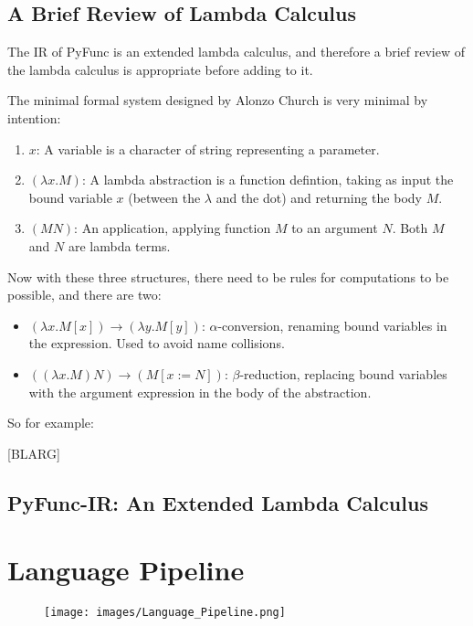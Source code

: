 \documentclass{l4proj}
\begin{document}
\subsection{A Brief Review of Lambda Calculus}

The IR of PyFunc is an extended lambda calculus, and therefore a brief review of the lambda calculus is appropriate before adding to it.

The minimal formal system designed by Alonzo Church is very minimal by intention:

\begin{enumerate}
    \item $x$: A variable is a character of string representing a parameter.
    \item $(\lambda x . M)$: A lambda abstraction is a function defintion, taking as input the bound variable $x$ (between the $\lambda$ and the dot) and returning the body $M$.
    \item $(M N)$: An application, applying function $M$ to an argument $N$. Both $M$ and $N$ are lambda terms.
\end{enumerate}

Now with these three structures, there need to be rules for computations to be possible, and there are two:
\begin{itemize}
    \item $(\lambda x . M [x]) \rightarrow (\lambda y . M[y])$: $\alpha$-conversion, renaming bound variables in the expression. Used to avoid name collisions.
    \item $((\lambda x . M) N) \rightarrow (M [x := N])$: $\beta$-reduction, replacing bound variables with the argument expression in the body of the abstraction.
\end{itemize}

So for example:

[BLARG]

\subsection{PyFunc-IR: An Extended Lambda Calculus}



\section{Language Pipeline}

\begin{figure}[!h]
    \texttt{[image: images/Language\_Pipeline.png]}
\end{figure}    
\end{document}
